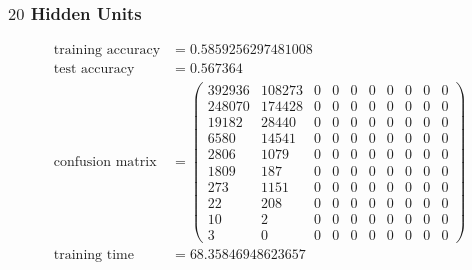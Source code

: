 \documentclass[11pt]{article}
\begin{document}
\subsubsection{$20$ Hidden Units}
\begin{equation}
  \begin{split}
    \text{training accuracy} &= 0.5859256297481008\\
    \text{test accuracy} &= 0.567364\\
    \text{confusion matrix} &=
    \begin{pmatrix}
      392936 & 108273 & 0 & 0 & 0 & 0 & 0 & 0 & 0 & 0 \\
      248070 & 174428 & 0 & 0 & 0 & 0 & 0 & 0 & 0 & 0 \\
      19182  & 28440  & 0 & 0 & 0 & 0 & 0 & 0 & 0 & 0 \\
      6580   & 14541  & 0 & 0 & 0 & 0 & 0 & 0 & 0 & 0 \\
      2806   & 1079   & 0 & 0 & 0 & 0 & 0 & 0 & 0 & 0 \\
      1809   & 187    & 0 & 0 & 0 & 0 & 0 & 0 & 0 & 0 \\
      273    & 1151   & 0 & 0 & 0 & 0 & 0 & 0 & 0 & 0 \\
      22     & 208    & 0 & 0 & 0 & 0 & 0 & 0 & 0 & 0 \\
      10     & 2      & 0 & 0 & 0 & 0 & 0 & 0 & 0 & 0 \\
      3      & 0      & 0 & 0 & 0 & 0 & 0 & 0 & 0 & 0
    \end{pmatrix}\\
    \text{training time} &= 68.35846948623657
  \end{split}
\end{equation}
\end{document}
